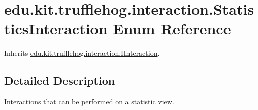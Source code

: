 \hypertarget{enumedu_1_1kit_1_1trufflehog_1_1interaction_1_1_statistics_interaction}{}\section{edu.\+kit.\+trufflehog.\+interaction.\+Statistics\+Interaction Enum Reference}
\label{enumedu_1_1kit_1_1trufflehog_1_1interaction_1_1_statistics_interaction}


Inherits \hyperlink{interfaceedu_1_1kit_1_1trufflehog_1_1interaction_1_1_i_interaction}{edu.\+kit.\+trufflehog.\+interaction.\+I\+Interaction}.



\subsection{Detailed Description}
Interactions that can be performed on a statistic view. 